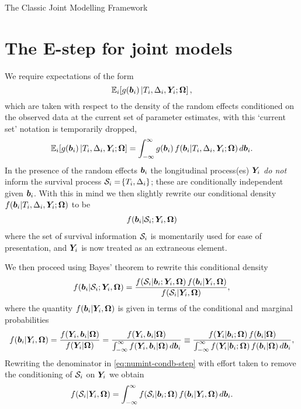 \begin{chapter}{\label{cha:methods-classic}The Classic Joint Modelling Framework}
  \section{The E-step for joint models}\label{sec:methods-Estepdetails}
  We require expectations of the form 
  \begin{equation*}
      \mathbb{E}_i\!\left[ g\!\left(\bm{b}_i\right)|T_i, \Delta_i, \bm{Y}_i; \bm{\mathrm{\Omega}}\right],
  \end{equation*}
  which are taken with respect to the density of the random effects conditioned on the observed data at the current set of parameter estimates, with this `current set' notation is temporarily dropped,
  \begin{equation}
      \mathbb{E}_i\!\left[ g\!\left(\bm{b}_i\right)|T_i, \Delta_i, \bm{Y}_i; \bm{\mathrm{\Omega}}\right]=\int_{-\infty}^\infty g\!\left(\bm{b}_i\right) f\!\left(\bm{b}_i|T_i, \Delta_i, \bm{Y}_i; \bm{\mathrm{\Omega}}\right) d\bm{b}_i.
  \label{eq:numint-target}
  \end{equation}
  In the presence of the random effects $\bm{b}_i$ the longitudinal process(es) $\bm{Y}_i$ \textit{do not} inform the survival process $\mathcal{S}_i=\!\left\{ T_i,\Delta_i\right\}$; these are conditionally independent given $\bm{b}_i$. With this in mind we then slightly rewrite our conditional density $f\!\left(\bm{b}_i|T_i, \Delta_i, \bm{Y}_i; \bm{\mathrm{\Omega}}\right)$ to be
  \begin{align*}
    f\!\left(\bm{b}_i|\mathcal{S}_i;\bm{Y}_i,\bm{\mathrm{\Omega}}\right)
  \end{align*}
  where the set of survival information $\mathcal{S}_i$ is momentarily used for ease of presentation, and $\bm{Y}_i$ is now treated as an extraneous element.

  We then proceed using Bayes' theorem to rewrite this conditional density 
  \begin{align}
    f\!\left(\bm{b}_i|\mathcal{S}_i;\bm{Y}_i,\bm{\mathrm{\Omega}}\right)=\frac{f\!\left(\mathcal{S}_i|\bm{b}_i;\bm{Y}_i,\bm{\mathrm{\Omega}}\right) f\!\left(\bm{b}_i|\bm{Y}_i,\bm{\mathrm{\Omega}}\right)}{f\!\left(\mathcal{S}_i|\bm{Y}_i,\bm{\mathrm{\Omega}}\right)},
  \label{eq:numint-condb-step}
  \end{align}
  where the quantity $f\!\left(\bm{b}_i|\bm{Y}_i,\bm{\mathrm{\Omega}}\right)$ is given in terms of the conditional and marginal probabilities
  \begin{align}
    f\lb\b|\Y,\bO\rb=\frac{f\lb\Y,\b|\bO\rb}{f\lb\Y|\bO\rb}=\frac{f\lb\Y,\b|\bO\rb}{\int_{-\infty}^\infty f\lb\Y,\b|\bO\rb d\b}\equiv
    \frac{f\lb\Y|\b;\bO\rb f\lb\b|\bO\rb}{\int_{-\infty}^\infty f\lb\Y|\b;\bO\rb f\lb\b|\bO\rb d\b},
  \label{eq:numint-problem}
  \end{align}
  Rewriting the denominator in \eqref{eq:numint-condb-step} with effort taken to remove the conditioning of $\mathcal{S}_i$ on $\bm{Y}_i$ we obtain
  \begin{align*}
    f\!\left(\mathcal{S}_i|\bm{Y}_i,\bm{\mathrm{\Omega}}\right)=\int_{-\infty}^\infty f\!\left(\mathcal{S}_i|\bm{b}_i;\bm{\mathrm{\Omega}}\right) f\!\left(\bm{b}_i|\bm{Y}_i,\bm{\mathrm{\Omega}}\right) d\bm{b}_i.
  \end{align*}


\end{chapter}
